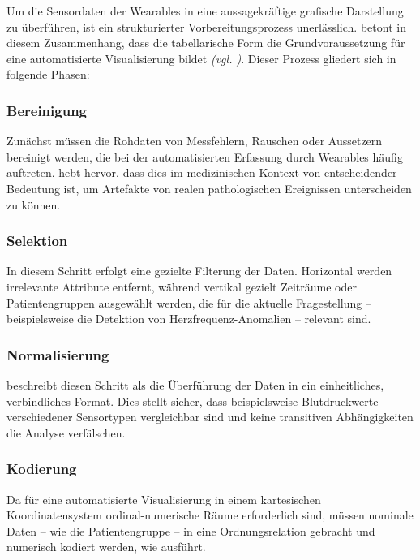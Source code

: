 Um die Sensordaten der Wearables in eine aussagekräftige grafische Darstellung zu überführen, ist ein strukturierter Vorbereitungsprozess unerlässlich. \citeauthor{1} betont in diesem Zusammenhang, dass die tabellarische Form die Grundvoraussetzung für eine automatisierte Visualisierung bildet \textit{(\acs{vgl.} \cite[11-13]{1})}. Dieser Prozess gliedert sich in folgende Phasen:

\subsubsection{Bereinigung}

Zunächst müssen die Rohdaten von Messfehlern, Rauschen oder Aussetzern bereinigt werden, die bei der automatisierten Erfassung durch Wearables häufig auftreten. \citeauthor{1} hebt hervor, dass dies im medizinischen Kontext von entscheidender Bedeutung ist, um Artefakte von realen pathologischen Ereignissen unterscheiden zu können.

\subsubsection{Selektion}

In diesem Schritt erfolgt eine gezielte Filterung der Daten. Horizontal werden irrelevante Attribute entfernt, während vertikal gezielt Zeiträume oder Patientengruppen ausgewählt werden, die für die aktuelle Fragestellung – beispielsweise die Detektion von Herzfrequenz-Anomalien – relevant sind.

\subsubsection{Normalisierung}

\citeauthor{1} beschreibt diesen Schritt als die Überführung der Daten in ein einheitliches, verbindliches Format. Dies stellt sicher, dass beispielsweise Blutdruckwerte verschiedener Sensortypen vergleichbar sind und keine transitiven Abhängigkeiten die Analyse verfälschen.

\subsubsection{Kodierung}

Da für eine automatisierte Visualisierung in einem kartesischen Koordinatensystem ordinal-numerische Räume erforderlich sind, müssen nominale Daten – wie die Patientengruppe – in eine Ordnungsrelation gebracht und numerisch kodiert werden, wie \citeauthor{1} ausführt.

